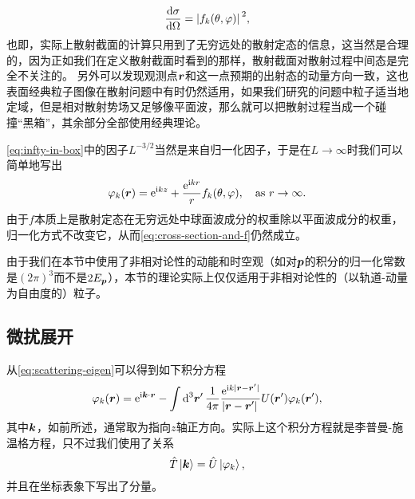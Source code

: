 \documentclass[UTF8, a4paper]{ctexart}
\newcommand*{\ee}{\mathrm{e}}
\newcommand*{\ii}{\mathrm{i}}
\begin{document}
\begin{equation}
    \dv{\sigma}{\Omega} = \abs*{f_k(\theta, \varphi)}^2,
    \label{eq:cross-section-and-f}
\end{equation}
也即，实际上散射截面的计算只用到了无穷远处的散射定态的信息，这当然是合理的，因为正如我们在定义散射截面时看到的那样，散射截面对散射过程中间态是完全不关注的。
另外可以发现观测点$\vb*{r}$和这一点预期的出射态的动量方向一致，这也表面经典粒子图像在散射问题中有时仍然适用，如果我们研究的问题中粒子适当地定域，但是相对散射势场又足够像平面波，那么就可以把散射过程当成一个碰撞“黑箱”，其余部分全部使用经典理论。

\eqref{eq:infty-in-box}中的因子$L^{-3/2}$当然是来自归一化因子，于是在$L \to \infty$时我们可以简单地写出
\begin{equation}
    \varphi_k(\vb*{r}) = \ee^{\ii k z} + \frac{\ee^{\ii k r}}{r} f_k(\theta, \varphi) , \quad \text{as $r \to \infty$}.
\end{equation}
由于$f$本质上是散射定态在无穷远处中球面波成分的权重除以平面波成分的权重，归一化方式不改变它，从而\eqref{eq:cross-section-and-f}仍然成立。

由于我们在本节中使用了非相对论性的动能和时空观（如对$\vb*{p}$的积分的归一化常数是$(2\pi)^3$而不是$2E_{\vb*{p}}$），本节的理论实际上仅仅适用于非相对论性的（以轨道-动量为自由度的）粒子。

\subsection{微扰展开}

从\eqref{eq:scattering-eigen}可以得到如下积分方程
\begin{equation}
    \varphi_k(\vb*{r}) = \ee^{\ii \vb*{k} \cdot \vb*{r}} - \int \dd[3]{\vb*{r}'} \frac{1}{4\pi} \frac{\ee^{\ii k \abs*{\vb*{r} - \vb*{r}'}}}{\abs*{\vb*{r} - \vb*{r}'}} U(\vb*{r}') \varphi_k(\vb*{r}'),
    \label{eq:born-eq}
\end{equation}
其中$\vb*{k}$，如前所述，通常取为指向$z$轴正方向。实际上这个积分方程就是李普曼-施温格方程，只不过我们使用了关系
\[
    \hat{T} \ket*{\vb*{k}} = \hat{U} \ket*{\varphi_k},
\]
并且在坐标表象下写出了分量。
\end{document}
